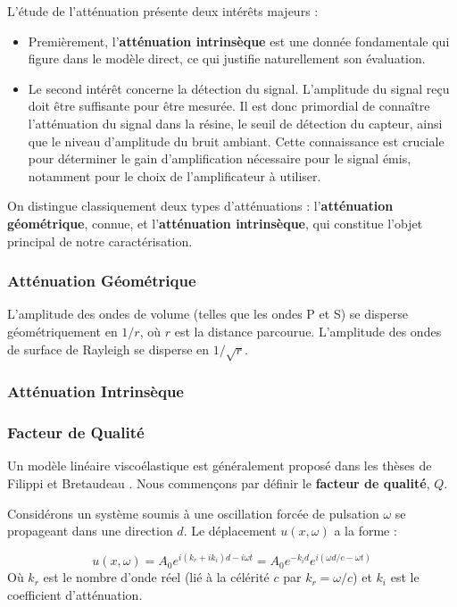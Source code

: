 L'étude de l'atténuation présente deux intérêts majeurs :
\begin{itemize}
    \item Premièrement, l'\textbf{atténuation intrinsèque} est une donnée fondamentale qui figure dans le modèle direct, ce qui justifie naturellement son évaluation.
    \item Le second intérêt concerne la détection du signal. L'amplitude du signal reçu doit être suffisante pour être mesurée. Il est donc primordial de connaître l'atténuation du signal dans la résine, le seuil de détection du capteur, ainsi que le niveau d'amplitude du bruit ambiant. Cette connaissance est cruciale pour déterminer le gain d'amplification nécessaire pour le signal émis, notamment pour le choix de l'amplificateur à utiliser.
\end{itemize}

On distingue classiquement deux types d'atténuations : l'\textbf{atténuation géométrique}, connue, et l'\textbf{atténuation intrinsèque}, qui constitue l'objet principal de notre caractérisation.

\subsubsection{Atténuation Géométrique}

L'amplitude des ondes de volume (telles que les ondes P et S) se disperse géométriquement en $1/r$, où $r$ est la distance parcourue. L'amplitude des ondes de surface de Rayleigh se disperse en $1/\sqrt{r}$.

\subsubsection*{Atténuation Intrinsèque}

\subsubsection*{Facteur de Qualité}

Un modèle linéaire viscoélastique est généralement proposé dans les thèses de Filippi et Bretaudeau \cite{Filippi, bretaudeau}. Nous commençons par définir le \textbf{facteur de qualité}, $Q$.

Considérons un système soumis à une oscillation forcée de pulsation $\omega$ se propageant dans une direction $d$. Le déplacement $u(x, \omega)$ a la forme :

\begin{equation}
u(x,\omega) = A_0 e^{i(k_r+ik_i)d - i\omega t} = A_0 e^{-k_id} e^{i(\omega d/c - \omega t)}
\end{equation}
Où $k_r$ est le nombre d'onde réel (lié à la célérité $c$ par $k_r = \omega/c$) et $k_i$ est le coefficient d'atténuation.

